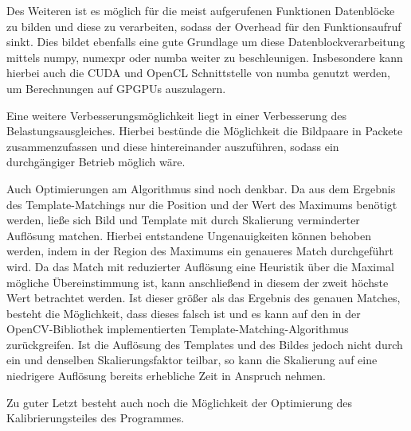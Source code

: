 Des Weiteren ist es möglich für die meist aufgerufenen Funktionen Datenblöcke zu bilden und diese zu verarbeiten, sodass der Overhead für den Funktionsaufruf sinkt. Dies bildet ebenfalls eine gute Grundlage um diese Datenblockverarbeitung mittels numpy, numexpr oder numba weiter zu beschleunigen. Insbesondere kann hierbei auch die CUDA und OpenCL Schnittstelle von numba genutzt werden, um Berechnungen auf \glspl{GPGPU} auszulagern. 

Eine weitere Verbesserungsmöglichkeit liegt in einer Verbesserung des Belastungsausgleiches. Hierbei bestünde die Möglichkeit die Bildpaare in Packete zusammenzufassen und diese hintereinander auszuführen, sodass ein durchgängiger Betrieb möglich wäre. 

Auch Optimierungen am Algorithmus sind noch denkbar. Da aus dem Ergebnis des Template-Matchings nur die Position und der Wert des Maximums benötigt werden, ließe sich Bild und Template mit durch Skalierung verminderter Auflösung matchen. Hierbei entstandene Ungenauigkeiten können behoben werden, indem in der Region des Maximums ein genaueres Match durchgeführt wird. Da das Match mit reduzierter Auflösung eine Heuristik über die Maximal mögliche Übereinstimmung ist, kann anschließend in diesem der zweit höchste Wert betrachtet werden. Ist dieser größer als das Ergebnis des genauen Matches, besteht die Möglichkeit, dass dieses falsch ist und es kann auf den in der OpenCV-Bibliothek implementierten Template-Matching-Algorithmus zurückgreifen. Ist die Auflösung des Templates und des Bildes jedoch nicht durch ein und denselben Skalierungsfaktor teilbar, so kann die Skalierung auf eine niedrigere Auflösung bereits erhebliche Zeit in Anspruch nehmen. 

Zu guter Letzt besteht auch noch die Möglichkeit der Optimierung des Kalibrierungsteiles des Programmes. 